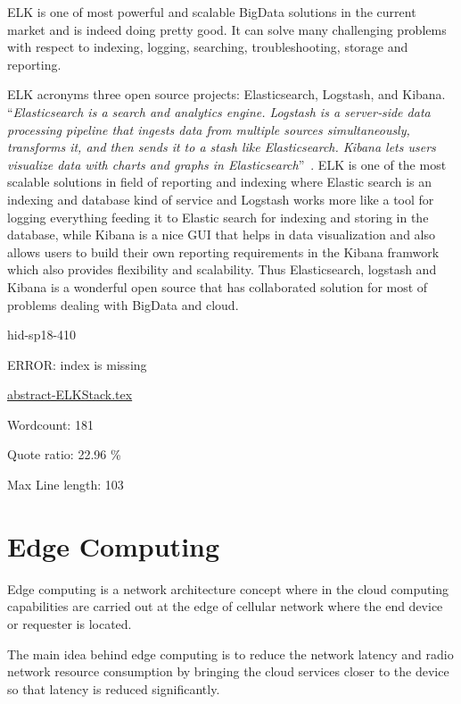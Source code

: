ELK is one of most powerful and scalable BigData solutions in the current
market and is indeed doing pretty good. It can solve many challenging 
problems with respect to indexing, logging, searching, troubleshooting,
storage and reporting.

ELK acronyms three open source projects: Elasticsearch, Logstash, 
and Kibana. \color{blue}``\emph{Elasticsearch is a search and analytics engine. Logstash is a 
server‑side data processing pipeline that ingests data from multiple sources 
simultaneously, transforms it, and then sends it to a stash like 
Elasticsearch. Kibana lets users visualize data with charts and graphs in 
Elasticsearch}''\color{black}~\cite{hid-sp18-410-ELKBlog}. ELK is one of the most scalable solutions in
field of reporting and indexing where Elastic search is an indexing and
database kind of service and Logstash works more like a tool for logging
everything feeding it to Elastic search for indexing and storing in 
the database, while Kibana is a nice GUI that helps in data visualization
and also allows users to build their own reporting requirements in the
Kibana framwork which also provides flexibility and scalability.
Thus Elasticsearch, logstash and Kibana is a wonderful open source that
has collaborated solution for most of problems dealing with BigData 
and cloud.



\begin{IU}

hid-sp18-410

ERROR: index is missing

\href{https://github.com/cloudmesh-community/hid-sp18-410/blob/master//technology/abstract-ELKStack.tex}{abstract-ELKStack.tex}

 

Wordcount: 181


Quote ratio: 22.96 \%
 
Max Line length: 103
\end{IU}

\section{Edge Computing}

Edge computing is a network architecture concept where in the cloud 
computing capabilities are carried out at the edge of cellular network
where the end device or requester is located.

The main idea behind edge computing is to reduce the network latency and
radio network resource consumption by bringing the cloud services closer
to the device so that latency is reduced significantly.


